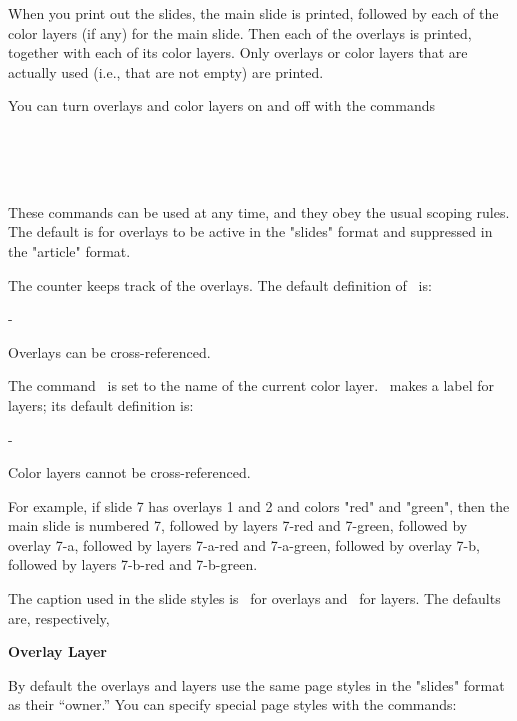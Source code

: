 When you print out the slides, the main slide is printed, followed by each of
the color layers (if any) for the main slide. Then each of the overlays is
printed, together with each of its color layers. Only overlays or color layers
that are actually used (i.e., that are not empty) are printed.

You can turn overlays and color layers on and off with the commands
\begin{MD}
  \overlaystrue\\
  \overlaysfalse\\
  \layerstrue\\
  \layersfalse
\end{MD}
These commands can be used at any time, and they obey the usual scoping rules.
The default is for overlays to be active in the "slides" format and suppressed
in the "article" format.

The counter  keeps track of the overlays. The default definition of
\N\theoverlay\ is:
\begin{LVerbatim}
  \theslide-
\end{LVerbatim}
Overlays can be cross-referenced.

The command \N\currlayer\ is set to the name of the current color layer.
\N\thelayer\ makes a label for layers; its default definition is:
\begin{LVerbatim}
  \theoverlay-\currlayer
\end{LVerbatim}
Color layers cannot be cross-referenced.

For example, if slide 7 has overlays 1 and 2 and colors "red" and "green",
then the main slide is numbered 7, followed by layers 7-red and 7-green,
followed by overlay 7-a, followed by layers 7-a-red and 7-a-green, followed by
overlay 7-b, followed by layers 7-b-red and 7-b-green.

The caption used in the slide styles is \n\overlaylabel\ for overlays and
\N\layerlabel\ for layers. The defaults are, respectively,
\begin{LVerbatim}
  \bf Overlay \theoverlay
  \bf Layer \thelayer
\end{LVerbatim}

By default the overlays and layers use the same page styles in the "slides"
format as their ``owner.'' You can specify special page styles with the
commands:
\begin{MD}
  \\
\end{MD}

